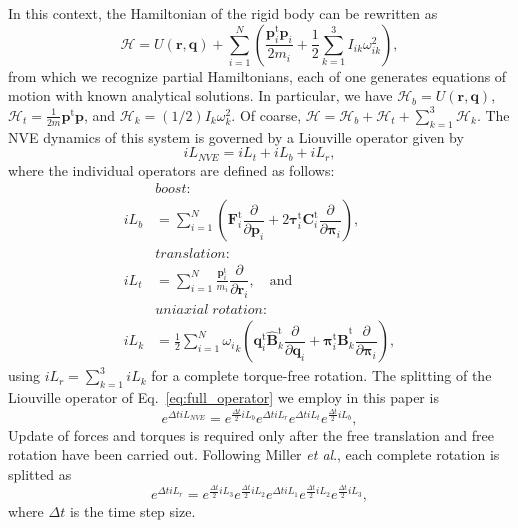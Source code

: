\documentclass[aip,jcp,reprint,amsmath,amssymb]{revtex4-1}
\newcommand{\mt}[1]{\boldsymbol{\mathbf{#1}}}           %
\newcommand{\vt}[1]{\boldsymbol{\mathbf{#1}}}           %
\newcommand{\tr}[1]{#1^\text{t}}                        %
\newcommand{\diff}[2]{\dfrac{\partial #1}{\partial #2}} %
\begin{document}
In this context, the Hamiltonian of the rigid body can be rewritten as
\begin{equation}
\label{eq:H_split_omega}
\mathcal{H} =  U(\vt r, \vt q) +  \sum_{i=1}^N \left( \frac{\tr{\vt p_i} \vt p_i}{2m_i} + \frac{1}{2} \sum_{k=1}^3 I_{ik} \omega_{ik}^2\right),
\end{equation}
from which we recognize partial Hamiltonians, each of one generates equations of motion with known analytical solutions. In particular, we have $\mathcal{H}_b = U(\vt r, \vt q)$, $\mathcal{H}_{t} = \frac{1}{2m}\tr{\vt p} \vt p$, and $\mathcal{H}_k = (1/2) I_k \omega_k^2$. Of coarse, $\mathcal{H} = \mathcal{H}_b + \mathcal{H}_t + \sum_{k=1}^3 \mathcal{H}_k$. The NVE dynamics of this system is governed by a Liouville operator given by\cite{Abreu_2017}
\begin{equation}
\label{eq:full_operator}
i\!L_{NVE} = i\!L_t + i\!L_b + i\!L_r,
\end{equation}
where the individual operators are defined as follows:
\[
\begin{split}
&boost:\\
i\!L_b &= \sum_{i=1}^N \left( \tr{\vt F}_i \diff{}{\vt p_i} + 2 \tr{\vt \tau}_i \tr{\mt C}_i \diff{}{\vt \pi_i} \right), \\
&translation: \\
 i\!L_t &= \sum_{i=1}^N \frac{\tr{\vt p}_i}{m_i}\diff{}{\vt r_i}, \quad \text{and} \\
&uniaxial \; rotation:\\
 i\!L_k &= \frac{1}{2} \sum_{i=1}^N {\omega_i}_k \left( \tr{\vt q}_i\tr{\hat{\mt B}_k} \diff{}{\vt q_i} + \tr{\vt \pi_i}\tr{\hat{\mt B}_k} \diff{}{\vt \pi_i} \right),
\end{split}
\]
using $i\!L_r = \sum_{k=1}^3 i\!L_k$ for a complete torque-free rotation.
The splitting of the Liouville operator of Eq.~\eqref{eq:full_operator} we employ in this paper is
\begin{equation}
\label{eq:trotter_splitting_NVE}
e^{\Delta t i\!L_{NVE}} = e^{\frac{\Delta t}{2} i\!L_b} e^{\Delta t i\!L_r} e^{\Delta t i\!L_t} e^{\frac{\Delta t}{2} i\!L_b},
\end{equation}
Update of forces and torques is required only after the free translation and free rotation have been carried out. Following Miller \textit{et al}.,\cite{Miller2002} each complete rotation is splitted as
\begin{equation}
\label{eq:splitting_rot}
e^{\Delta t i\!L_r} =  e^{\frac{\Delta t}{2} i\!L_3} e^{\frac{\Delta t}{2} i\!L_2} e^{\Delta t i\!L_1} e^{\frac{\Delta t}{2} i\!L_2} e^{\frac{\Delta t}{2} i\!L_3},
\end{equation}
where ${\Delta t}$ is the time step size.
\end{document}

